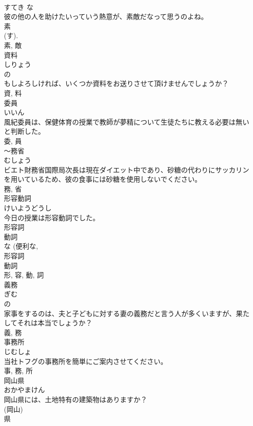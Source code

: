 \documentclass[8pt]{extreport}
\begin{document}
\begin{CJK}{UTF8}{min}
\\	すてき	な 
\\	彼の他の人を助けたいっていう熱意が、素敵だなって思うのよね。	
\\	素 
\\	(す). 
\\	素, 敵	
\\	資料	
\\	しりょう	
\\	の 
\\	もしよろしければ、いくつか資料をお送りさせて頂けませんでしょうか？	
\\	資, 料	
\\	委員	
\\	いいん	
\\	風紀委員は、保健体育の授業で教師が夢精について生徒たちに教える必要は無いと判断した。	
\\	委, 員	
\\	〜務省	
\\	むしょう	
\\	ビエト財務省国際局次長は現在ダイエット中であり、砂糖の代わりにサッカリンを用いているため、彼の食事には砂糖を使用しないでください。	
\\	務, 省	
\\	形容動詞	
\\	けいようどうし	
\\	今日の授業は形容動詞でした。	
\\	形容詞 
\\	動詞 
\\	な (便利な, 
\\	形容詞 
\\	動詞 
\\	形, 容, 動, 詞	
\\	義務	
\\	ぎむ	
\\	の 
\\	家事をするのは、夫と子どもに対する妻の義務だと言う人が多くいますが、果たしてそれは本当でしょうか？	
\\	義, 務	
\\	事務所	
\\	じむしょ	
\\	当社トフグの事務所を簡単にご案内させてください。	
\\	事, 務, 所	
\\	岡山県	
\\	おかやまけん	
\\	岡山県には、土地特有の建築物はありますか？	
\\	(岡山) 
\\	県 

\end{CJK}
\end{document}
